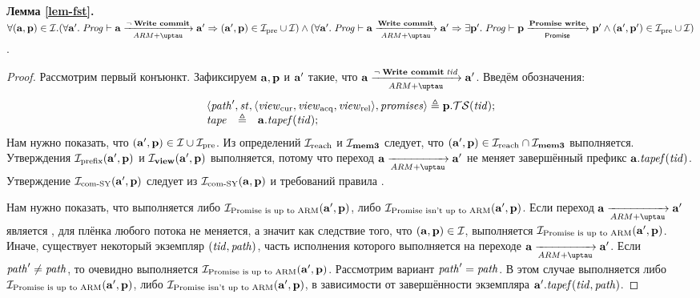 \noindent
\textbf{Лемма \ref{lem-fst}.}
$\forall (\aT, \p) \in \simrel. \\
(\forall \aT'. \; \Cfprom \vdash \aT \armStepgen{\lnot \; \transenv{Write commit}} \aT' \Rightarrow (\aT', \p) \in \simrelPre \cup \simrel) \land {} \\
(\forall \aT'. \; \Cfprom \vdash \aT \armStepgen{\transenv{Write commit}} \aT' \Rightarrow
\exists \p'. \; \Cfprom \vdash \p \promStepgen{\transenv{Promise write}} \p' \land  (\aT', \p') \in \simrelPre \cup \simrel)$.
\begin{proof}
  Рассмотрим первый конъюнкт.
  Зафиксируем $\mathbf{a}, \mathbf{p}$ и $\mathbf{a}'$ такие, что $\aT \armStepgen{\lnot \; \transenv{Write commit} \; \tId} \aT'$.
  Введём обозначения:
\[
\begin{array}{l l l}
\multicolumn{3}{l}{\angled{\cpath', \PromState, \angled{\Rcur, \Racq, \Rrel}, \PromSet} \triangleq \p.\TSfprom(\tId);}\\
\tape     & \triangleq & \aT.\tapef(\tId); \\
\end{array}
\]
  Нам нужно показать, что $(\mathbf{a}', \mathbf{p}) \in \mathcal{I} \cup \mathcal{I}_{\textup{\rm pre}}$.
  Из определений $\mathcal{I}_{\textup{\rm reach}}$ и $\mathcal{I}_{\rm \bf mem3}$ следует, что $(\mathbf{a}', \mathbf{p}) \in \mathcal{I}_{\textup{\rm reach}} \cap \mathcal{I}_{\rm \bf mem3}$ выполняется.
  Утверждения $\mathcal{I}_{\textup{\rm prefix}}(\mathbf{a}', \mathbf{p})$ и $\mathcal{I}_{\rm \bf view}(\mathbf{a}', \mathbf{p})$ выполняется, потому что переход $\aT \armStepgen{} \aT'$
  не меняет завершённый префикс $\mathbf{a}.\mathit{tapef}(\mathit{tid})$.
  Утверждение $\mathcal{I}_{\textup{\rm com-SY}}(\mathbf{a}', \mathbf{p})$ следует из $\mathcal{I}_{\textup{\rm com-SY}}(\mathbf{a}, \mathbf{p})$ и требований правила .
   
  Нам нужно показать, что выполняется либо $\mathcal{I}_{\textup{\rm Promise is up to ARM}}(\mathbf{a}', \mathbf{p})$, либо $\mathcal{I}_{\textup{\rm Promise isn't up to ARM}}(\mathbf{a}', \mathbf{p})$.
  Если переход $\aT \armStepgen{} \aT'$ является ,
  для плёнка любого потока не меняется, а значит как следствие того, что $(\mathbf{a}, \mathbf{p}) \in \mathcal{I}$,
  выполняется $\mathcal{I}_{\textup{\rm Promise is up to ARM}}(\mathbf{a}', \mathbf{p})$.
  Иначе, существует некоторый экземпляр $(\mathit{tid}, \mathit{path})$, часть исполнения которого выполняется на переходе $\aT \armStepgen{} \aT'$.
  Если $\mathit{path}' \not = \mathit{path}$, то очевидно выполняется $\mathcal{I}_{\textup{\rm Promise is up to ARM}}(\mathbf{a}', \mathbf{p})$.
  Рассмотрим вариант $\mathit{path}' = \mathit{path}$.
  В этом случае выполняется либо $\mathcal{I}_{\textup{\rm Promise is up to ARM}}(\mathbf{a}', \mathbf{p})$, либо $\mathcal{I}_{\textup{\rm Promise isn't up to ARM}}(\mathbf{a}', \mathbf{p})$,
  в зависимости от завершённости экземпляра $\mathbf{a}'.\mathit{tapef}(\mathit{tid}, \mathit{path})$.


\end{proof}
